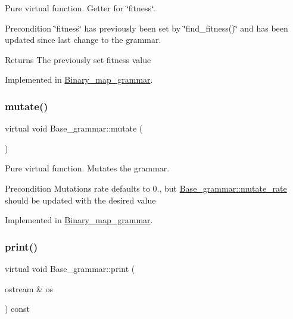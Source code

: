 Pure virtual function. Getter for \char`\"{}fitness\char`\"{}. 

\begin{DoxyPrecond}{Precondition}
\char`\"{}fitness\char`\"{} has previously been set by \char`\"{}find\+\_\+fitness()\char`\"{} and has been updated since last change to the grammar. 
\end{DoxyPrecond}
\begin{DoxyReturn}{Returns}
The previously set fitness value 
\end{DoxyReturn}


Implemented in \mbox{\hyperlink{classBinary__map__grammar_a4576956993498f6935206bb70c40fda7}{Binary\+\_\+map\+\_\+grammar}}.

\mbox{\label{classBase__grammar_a0149287d3e0be2f7fd3657f1c30ac62d}} 
\subsubsection{\texorpdfstring{mutate()}{mutate()}}
{\footnotesize\ttfamily virtual void Base\+\_\+grammar\+::mutate (\begin{DoxyParamCaption}{ }\end{DoxyParamCaption})\hspace{0.3cm}{\ttfamily [pure virtual]}}



Pure virtual function. Mutates the grammar. 

\begin{DoxyPrecond}{Precondition}
Mutations rate defaults to 0., but \mbox{\hyperlink{classBase__grammar_aebe2216bc0bfd1139d63e5e3dec3c8e8}{Base\+\_\+grammar\+::mutate\+\_\+rate}} should be updated with the desired value 
\end{DoxyPrecond}


Implemented in \mbox{\hyperlink{classBinary__map__grammar_aa4c18786cf06a366de319c521767b7ce}{Binary\+\_\+map\+\_\+grammar}}.

\mbox{\label{classBase__grammar_acc90ffd8e04ba0a51750a15c158ce790}} 
\subsubsection{\texorpdfstring{print()}{print()}}
{\footnotesize\ttfamily virtual void Base\+\_\+grammar\+::print (\begin{DoxyParamCaption}\item[{ostream \&}]{os }\end{DoxyParamCaption}) const\hspace{0.3cm}{\ttfamily [pure virtual]}}



